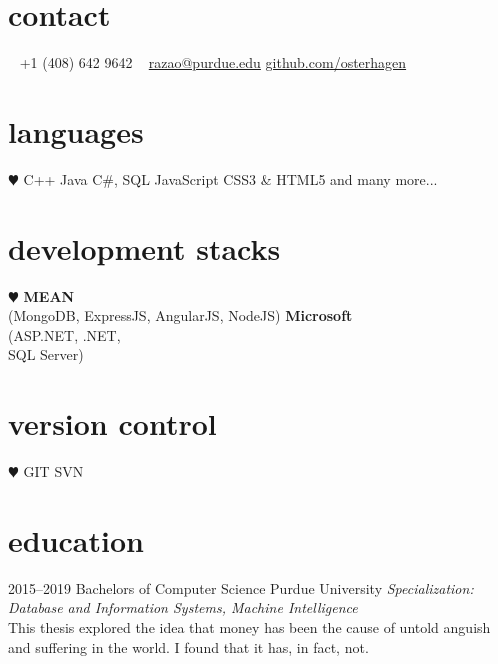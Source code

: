 \documentclass[]{friggeri-cv} %
\begin{document}


\begin{aside} %
\section{contact}

~
+1 (408) 642 9642
~
\href{mailto:razao@purdue.edu}{razao@purdue.edu}
\href{http://github.com/osterhagen}{github.com/osterhagen}
\section{languages}
{\color{red} $\varheartsuit$} C++ 
Java
C\#, SQL
JavaScript
CSS3 \& HTML5
and many more...

\section{development stacks}
{\color{red} $\varheartsuit$} \textbf{MEAN} \\(MongoDB, ExpressJS, AngularJS, NodeJS)
\textbf{Microsoft}\\ (ASP.NET, .NET,\\ SQL Server)

\section{version control}
{\color{red} $\varheartsuit$} GIT
SVN
\end{aside}


\section{education}

\begin{entrylist}


\entry
{2015--2019}
{Bachelors {\normalfont of Computer Science}}
{Purdue University}
{\emph{Specialization: Database and Information Systems, Machine Intelligence} \\ This thesis explored the idea that money has been the cause of untold anguish and suffering in the world. I found that it has, in fact, not.}

\end{entrylist}
\end{document}
